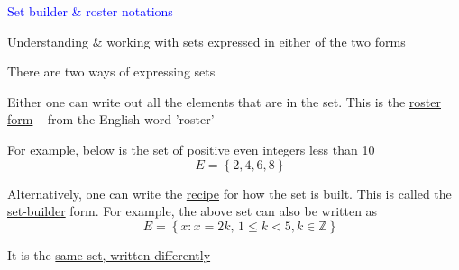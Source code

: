 \documentclass[14pt,fleqn]{extarticle}
\begin{document}
 
\begin{skill}
\begin{narrow}
\textcolor{blue}{Set builder \& roster notations}

Understanding \& working with sets expressed in either of the two forms
\end{narrow}

\reason 

There are two ways of expressing sets \newline 

Either one can write out all the elements that are in the set. This is the \underline{roster form} -- from the English word 'roster'\newline 

For example, below is the set of positive even integers less than 10
\[ \quad E = \left\lbrace 2,4,6,8 \right\rbrace\]

Alternatively, one can write the \underline{recipe} for how the set is built. This is called the \underline{set-builder} form. For example, the above set can also be written as 
\[ \quad E = \left\lbrace x : x = 2k,\, 1\leq k < 5, k\in\mathbb{Z} \right\rbrace\]

It is the \underline{same set, written differently}
\end{skill} 
\end{document}
